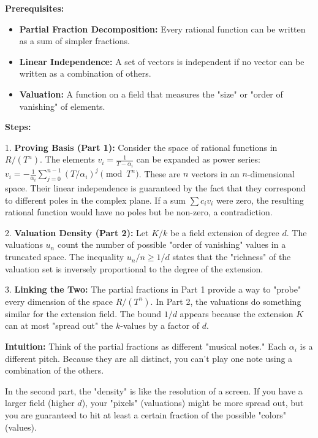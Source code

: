 \begin{solution}
\textbf{Prerequisites:}
\begin{itemize}
    \item \textbf{Partial Fraction Decomposition:} Every rational function can be written as a sum of simpler fractions.
    \item \textbf{Linear Independence:} A set of vectors is independent if no vector can be written as a combination of others.
    \item \textbf{Valuation:} A function on a field that measures the "size" or "order of vanishing" of elements.
\end{itemize}

\textbf{Steps:}

1. \textbf{Proving Basis (Part 1):} Consider the space of rational functions in $R/(T^n)$. The elements $v_i = \frac{1}{T-\alpha_i}$ can be expanded as power series: $v_i = -\frac{1}{\alpha_i} \sum_{j=0}^{n-1} (T/\alpha_i)^j \pmod{T^n}$. These are $n$ vectors in an $n$-dimensional space. Their linear independence is guaranteed by the fact that they correspond to different poles in the complex plane. If a sum $\sum c_i v_i$ were zero, the resulting rational function would have no poles but be non-zero, a contradiction.

2. \textbf{Valuation Density (Part 2):} Let $K/k$ be a field extension of degree $d$. The valuations $u_n$ count the number of possible "order of vanishing" values in a truncated space. The inequality $u_n/n \geq 1/d$ states that the "richness" of the valuation set is inversely proportional to the degree of the extension.

3. \textbf{Linking the Two:} The partial fractions in Part 1 provide a way to "probe" every dimension of the space $R/(T^n)$. In Part 2, the valuations do something similar for the extension field. The bound $1/d$ appears because the extension $K$ can at most "spread out" the $k$-values by a factor of $d$.

\textbf{Intuition:}
Think of the partial fractions as different "musical notes." Each $\alpha_i$ is a different pitch. Because they are all distinct, you can't play one note using a combination of the others. 

In the second part, the "density" is like the resolution of a screen. If you have a larger field (higher $d$), your "pixels" (valuations) might be more spread out, but you are guaranteed to hit at least a certain fraction of the possible "colors" (values).

\end{solution}

